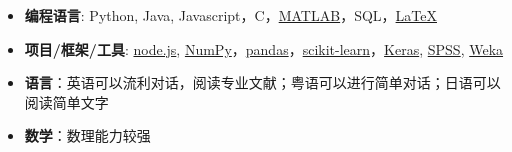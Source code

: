   \begin{itemize}[leftmargin=*]
    \item \textbf{编程语言}: Python, Java, Javascript，C，\href{https://www.mathworks.com/}{MATLAB}，SQL，\href{https://www.latex-project.org/}{\LaTeX}
    \item \textbf{项目/框架/工具}: \href{https://nodejs.org/en/}{node.js}, \href{http://www.numpy.org/}{NumPy}，\href{https://pandas.pydata.org/}{pandas}，\href{http://scikit-learn.org//}{scikit-learn}，\href{https://keras.io/}{Keras}, \href{https://www.ibm.com/analytics/spss-statistics-software}{SPSS}, \href{https://www.cs.waikato.ac.nz/~ml/weka/}{Weka}
    \item \textbf{语言}：英语可以流利对话，阅读专业文献；粤语可以进行简单对话；日语可以阅读简单文字
    \item \textbf{数学}：数理能力较强
  \end{itemize}
